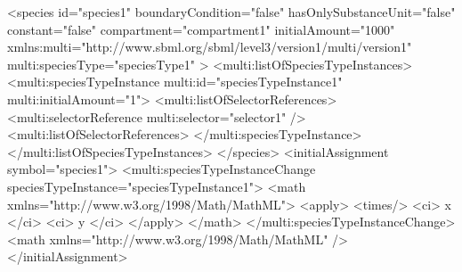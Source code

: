 \begin{example}
<species id="species1" 
         boundaryCondition="false" hasOnlySubstanceUnit="false" constant="false"
         compartment="compartment1" initialAmount="1000"
         xmlns:multi="http://www.sbml.org/sbml/level3/version1/multi/version1"
         multi:speciesType="speciesType1" >
  <multi:listOfSpeciesTypeInstances>
    <multi:speciesTypeInstance multi:id="speciesTypeInstance1" multi:initialAmount="1">
      <multi:listOfSelectorReferences>
        <multi:selectorReference multi:selector="selector1" />
      <multi:listOfSelectorReferences>
    </multi:speciesTypeInstance>
  </multi:listOfSpeciesTypeInstances>
</species>
<initialAssignment symbol="species1">
  <multi:speciesTypeInstanceChange speciesTypeInstance="speciesTypeInstance1">
    <math xmlns="http://www.w3.org/1998/Math/MathML">
      <apply>
        <times/>
        <ci> x </ci>
        <ci> y </ci>
      </apply>
    </math>
  </multi:speciesTypeInstanceChange>
  <math xmlns="http://www.w3.org/1998/Math/MathML" />
</initialAssignment>
\end{example}